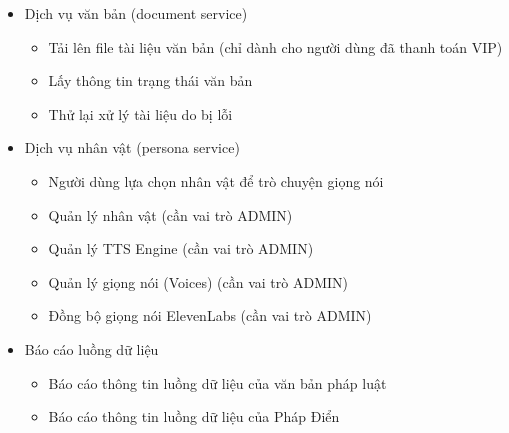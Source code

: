 \begin{itemize}

\item Dịch vụ văn bản (document service)
\begin{itemize}
\item Tải lên file tài liệu văn bản (chỉ dành cho người dùng đã thanh toán VIP)
\item Lấy thông tin trạng thái văn bản
\item Thử lại xử lý tài liệu do bị lỗi
\end{itemize}

\item Dịch vụ nhân vật (persona service)
\begin{itemize}
\item Người dùng lựa chọn nhân vật để trò chuyện giọng nói
\item Quản lý nhân vật (cần vai trò ADMIN)
\item Quản lý TTS Engine (cần vai trò ADMIN)
\item Quản lý giọng nói (Voices) (cần vai trò ADMIN)
\item Đồng bộ giọng nói ElevenLabs (cần vai trò ADMIN)
\end{itemize}

\item Báo cáo luồng dữ liệu
\begin{itemize}
\item Báo cáo thông tin luồng dữ liệu của văn bản pháp luật
\item Báo cáo thông tin luồng dữ liệu của Pháp Điển
\end{itemize}

\end{itemize}

